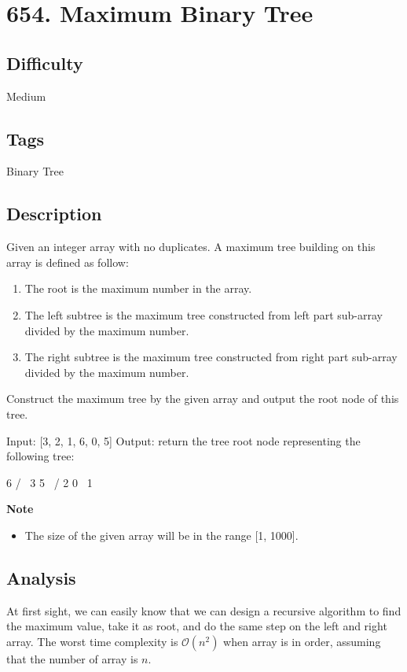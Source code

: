 \tocless\section{654. Maximum Binary Tree}
\label{algo:654}

\subsection*{Difficulty}
Medium

\subsection*{Tags}
Binary Tree

\subsection*{Description}
Given an integer array with no duplicates. A maximum tree building on this array is defined as follow:
\begin{enumerate}
	\item The root is the maximum number in the array.
	\item The left subtree is the maximum tree constructed from left part sub-array divided by the maximum number.
	\item The right subtree is the maximum tree constructed from right part sub-array divided by the maximum number.
\end{enumerate}

Construct the maximum tree by the given array and output the root node of this tree.

\begin{example}
\begin{multilinecode}
Input: [3, 2, 1, 6, 0, 5]
Output: return the tree root node representing the following tree:

      6
    /   \
   3     5
    \    / 
     2  0   
       \
        1
\end{multilinecode}
\end{example}

\textbf{Note}
\begin{itemize}
\item The size of the given array will be in the range [1, 1000].
\end{itemize}

\subsection*{Analysis}
At first sight, we can easily know that we can design a recursive algorithm to find the maximum value, take it as root, and do the same step on the left and right array. The worst time complexity is $\mathcal{O}(n^2)$ when array is in order, assuming that the number of array is $n$.

